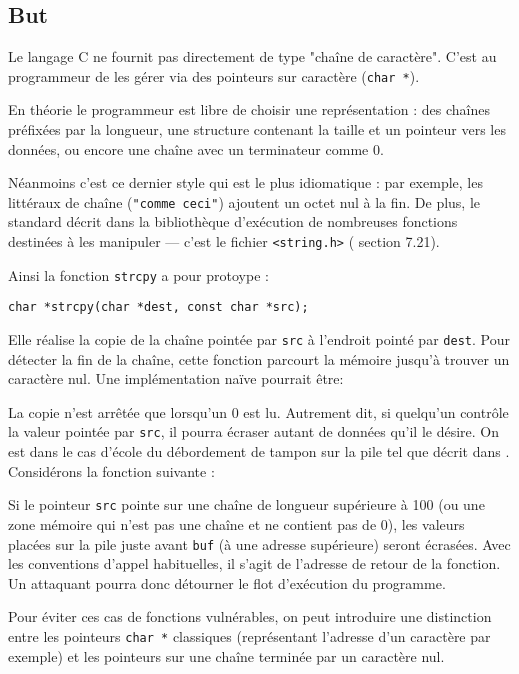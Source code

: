 \subsection{But}

Le langage C ne fournit pas directement de type "chaîne de caractère". C'est au
programmeur de les gérer via des pointeurs sur caractère (\texttt{char *}).

En théorie le programmeur est libre de choisir une représentation : des chaînes
préfixées par la longueur, une structure contenant la taille et un pointeur vers
les données, ou encore une chaîne avec un terminateur comme 0.

Néanmoins c'est ce dernier style qui est le plus idiomatique : par exemple, les
littéraux de chaîne (\texttt{"comme ceci"}) ajoutent un octet nul à la fin. De
plus, le standard décrit dans la bibliothèque d'exécution de nombreuses
fonctions destinées à les manipuler --- c'est le fichier
\texttt{\textless{}string.h\textgreater{}} (\cite{AnsiC} section 7.21).

Ainsi la fonction \texttt{strcpy} a pour protoype :

\begin{Verbatim}
char *strcpy(char *dest, const char *src);
\end{Verbatim}

Elle réalise la copie de la chaîne pointée par \texttt{src} à l'endroit pointé
par \texttt{dest}. Pour détecter la fin de la chaîne, cette fonction parcourt la
mémoire jusqu'à trouver un caractère nul. Une implémentation naïve pourrait être:


La copie n'est arrêtée que lorsqu'un 0 est lu. Autrement dit, si quelqu'un
contrôle la valeur pointée par \texttt{src}, il pourra écraser autant de données
qu'il le désire. On est dans le cas d'école du débordement de tampon sur la pile
tel que décrit dans \cite{SmashingTheStack}. Considérons la fonction suivante :


Si le pointeur \texttt{src} pointe sur une chaîne de longueur supérieure à 100
(ou une zone mémoire qui n'est pas une chaîne et ne contient pas de 0), les
valeurs placées sur la pile juste avant \texttt{buf} (à une adresse supérieure)
seront écrasées. Avec les conventions d'appel habituelles, il s'agit de
l'adresse de retour de la fonction. Un attaquant pourra donc détourner le flot
d'exécution du programme.

Pour éviter ces cas de fonctions vulnérables, on peut introduire une distinction
entre les pointeurs \texttt{char *} classiques (représentant l'adresse d'un
caractère par exemple) et les pointeurs sur une chaîne terminée par un caractère
nul.

